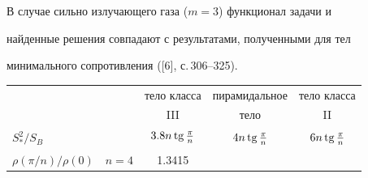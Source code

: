 В случае сильно излучающего газа ($m=3$) функционал задачи и


найденные решения совпадают с результатами, полученными для тел


минимального сопротивления ([6], с.\,306--325).


\vspace{0.2cm}





\hspace{125mm}{Таблица}


\vspace{0.3cm}


\begin{center}





\begin{tabular}{|l|l|c|c|c|c|c|c|}





\hline


\multicolumn{2}{|c|}{}


&\multicolumn{2}{|c|}{тело класса }


&\multicolumn{2}{|c|}{пирамидальное }


&\multicolumn{2}{|c|}{тело класса }\\


\multicolumn{2}{|c|}{}


&\multicolumn{2}{|c|}{III }


&\multicolumn{2}{|c|}{тело }


&\multicolumn{2}{|c|}{II }\\





\hline


\multicolumn{2}{|l|}{$ S^2_* / S_B$}


& \multicolumn{2}{|c|}{$3.\underset{\phantom{.}}{8}{} n \operatorname{tg} \frac{\pi}{n}$}


& \multicolumn{2}{|c|}{$4 n  \operatorname{tg} \frac{\pi}{n}$}


& \multicolumn{2}{|c|}{$6 n  \operatorname{tg} \frac{\pi}{n}$} \\





\hline


${\rho(\pi/n)} / {\rho(0)}$ & $n=4$


& \multicolumn{2}{|c|}{1.3415}



\end{tabular}
\end{center}
